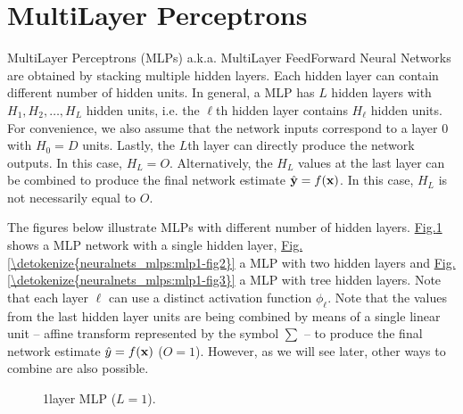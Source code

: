 \documentclass[letterpaper,10pt,english]{jupyterBook}
\let\sphinxpxdimen\pdfpxdimen\else\newdimen\sphinxpxdimen
\begin{document}
\sphinxstepscope


\section{Multi\sphinxhyphen{}Layer Perceptrons}
\label{\detokenize{neuralnets_mlps:multi-layer-perceptrons}}\label{\detokenize{neuralnets_mlps::doc}}
\sphinxAtStartPar
Multi\sphinxhyphen{}Layer Perceptrons (MLPs) a.k.a. Multi\sphinxhyphen{}Layer Feed\sphinxhyphen{}Forward Neural Networks are obtained by stacking multiple hidden layers. Each hidden layer can contain different number of hidden units. In general, a MLP has \(L\) hidden layers with \(H_{1}, H_{2}, \ldots, H_{L} \) hidden units, i.e. the \(\ell\)\sphinxhyphen{}th hidden layer contains \(H_{\ell}\) hidden units. For convenience, we also assume that the network inputs correspond to a layer \( 0 \) with \( H_{0} = D \) units. Lastly, the \( L\)\sphinxhyphen{}th layer can directly produce the network outputs. In this case, \( H_{L} = O \). Alternatively, the \( H_{L} \) values at the last layer can be combined  to produce the final network estimate \( \hat{\bf y} = f({\bf x}) \). In this case, \( H_{L} \) is not necessarily equal to \( O \).

\sphinxAtStartPar
The figures below illustrate MLPs with different number of hidden layers. \hyperref[\detokenize{neuralnets_mlps:mlp1-fig1}]{Fig.\@ \ref{\detokenize{neuralnets_mlps:mlp1-fig1}}} shows a MLP network with a single hidden layer, \hyperref[\detokenize{neuralnets_mlps:mlp1-fig2}]{Fig.\@ \ref{\detokenize{neuralnets_mlps:mlp1-fig2}}} a MLP with two hidden layers and \hyperref[\detokenize{neuralnets_mlps:mlp1-fig3}]{Fig.\@ \ref{\detokenize{neuralnets_mlps:mlp1-fig3}}} a MLP with tree hidden layers. Note that each layer \(\ell\) can use a distinct activation function \(\phi_{\ell}\). Note that the values from the last hidden layer units are being combined by means of a single linear unit – affine transform represented by the symbol \( \sum \) – to produce the final network estimate \( \hat{y} = f({\bf x}) \) (\( O = 1 \)). However, as we will see later, other ways to combine are also possible.


\begin{figure}
\centering
\noindent\sphinxincludegraphics[height=320\sphinxpxdimen]{{multi_layer_MLP_01}.png}
\caption{1\sphinxhyphen{}layer MLP (\(L=1\)).}\label{\detokenize{neuralnets_mlps:mlp1-fig1}}\end{figure}
\end{document}
